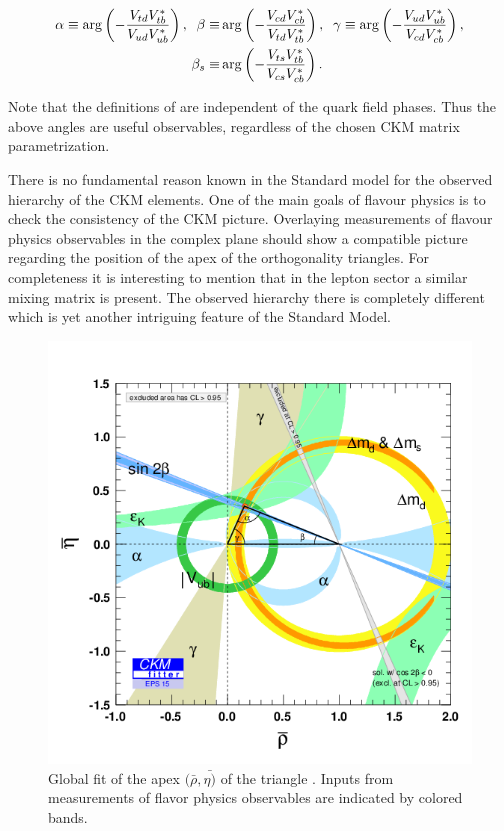 \begin{align}
  \centering
  \alpha \equiv \arg\left( -\frac{\Vtd\Vtb^*}{\Vud\Vub^*} \right),
  \;\;
  \beta  \equiv & \arg\left( -\frac{\Vcd\Vcb^*}{\Vtd\Vtb^*} \right),
  \;\;
  \gamma \equiv \arg\left( -\frac{\Vud\Vub^*}{\Vcd\Vcb^*} \right), \nonumber \\
  \betas \equiv & \arg\left( -\frac{\Vts\Vtb^*}{\Vcs\Vcb^*} \right).
  \label{ckm_angles_def}
\end{align}

\noindent Note that the definitions of  are independent of
the quark field phases. Thus the above angles are useful observables, regardless of the chosen
CKM matrix parametrization.

There is no fundamental reason known in the Standard model for the observed hierarchy of the CKM elements.
One of the main goals of flavour physics is to check the consistency of the CKM picture.
Overlaying measurements of flavour physics observables in the complex plane should show a compatible
picture regarding the position of the apex of the orthogonality triangles.
For completeness it is interesting to mention that in the lepton sector a similar mixing matrix is present.
The observed hierarchy there is completely different which is yet another intriguing feature of the Standard Model.

\begin{figure}[!h]
  \centering
    \includegraphics[trim=0cm 0.5cm 0cm 1.5cm, clip=true, width=\textwidth]{Figures/Chapter1/rhoeta_large.png}
    \caption{Global fit of the apex $(\bar{\rho},\bar{\eta)}$ of the \Bd triangle \cite{ckm-fitter-phis-pred}.
             Inputs from measurements of flavor physics observables are indicated by colored bands.}
    \label{unitarity_triangle}
\end{figure}

